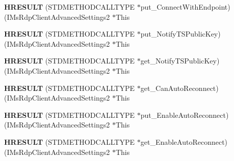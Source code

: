 \begin{DoxyCompactItemize}
\item 
\mbox{\label{struct_i_ms_rdp_client_advanced_settings2_vtbl_a368165cea324aade10f6d2669e80984a}} 
{\bfseries H\+R\+E\+S\+U\+LT} (S\+T\+D\+M\+E\+T\+H\+O\+D\+C\+A\+L\+L\+T\+Y\+PE $\ast$put\+\_\+\+Connect\+With\+Endpoint)(I\+Ms\+Rdp\+Client\+Advanced\+Settings2 $\ast$This
\item 
\mbox{\label{struct_i_ms_rdp_client_advanced_settings2_vtbl_af1fcf682cf2b9bc571a22bc11738d830}} 
{\bfseries H\+R\+E\+S\+U\+LT} (S\+T\+D\+M\+E\+T\+H\+O\+D\+C\+A\+L\+L\+T\+Y\+PE $\ast$put\+\_\+\+Notify\+T\+S\+Public\+Key)(I\+Ms\+Rdp\+Client\+Advanced\+Settings2 $\ast$This
\item 
\mbox{\label{struct_i_ms_rdp_client_advanced_settings2_vtbl_a947ce28ccc79144b901a6bc09ebfa32c}} 
{\bfseries H\+R\+E\+S\+U\+LT} (S\+T\+D\+M\+E\+T\+H\+O\+D\+C\+A\+L\+L\+T\+Y\+PE $\ast$get\+\_\+\+Notify\+T\+S\+Public\+Key)(I\+Ms\+Rdp\+Client\+Advanced\+Settings2 $\ast$This
\item 
\mbox{\label{struct_i_ms_rdp_client_advanced_settings2_vtbl_a187d38fa180def29a13d05627907b4ec}} 
{\bfseries H\+R\+E\+S\+U\+LT} (S\+T\+D\+M\+E\+T\+H\+O\+D\+C\+A\+L\+L\+T\+Y\+PE $\ast$get\+\_\+\+Can\+Auto\+Reconnect)(I\+Ms\+Rdp\+Client\+Advanced\+Settings2 $\ast$This
\item 
\mbox{\label{struct_i_ms_rdp_client_advanced_settings2_vtbl_a85e7b5796c5d2b08360bf173bcfb8c79}} 
{\bfseries H\+R\+E\+S\+U\+LT} (S\+T\+D\+M\+E\+T\+H\+O\+D\+C\+A\+L\+L\+T\+Y\+PE $\ast$put\+\_\+\+Enable\+Auto\+Reconnect)(I\+Ms\+Rdp\+Client\+Advanced\+Settings2 $\ast$This
\item 
\mbox{\label{struct_i_ms_rdp_client_advanced_settings2_vtbl_a0de0611469329ebde090fc6322e9edc2}} 
{\bfseries H\+R\+E\+S\+U\+LT} (S\+T\+D\+M\+E\+T\+H\+O\+D\+C\+A\+L\+L\+T\+Y\+PE $\ast$get\+\_\+\+Enable\+Auto\+Reconnect)(I\+Ms\+Rdp\+Client\+Advanced\+Settings2 $\ast$This
\item 
\mbox{\label{struct_i_ms_rdp_client_advanced_settings2_vtbl_acab7d9199fc68be22ef19313e44a1286}} 

\end{DoxyCompactItemize}
